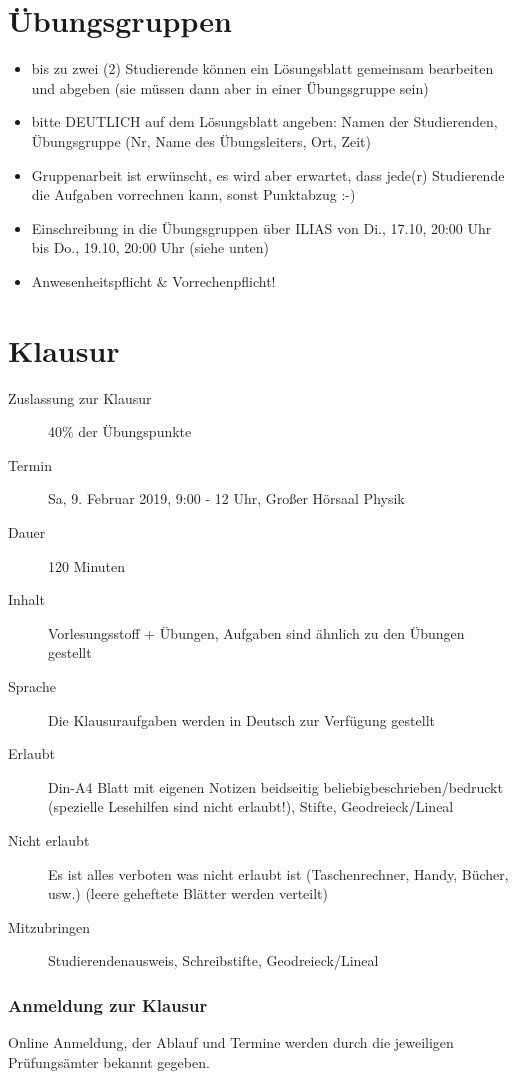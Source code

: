 \documentclass[titlepage,11pt,a4paper,ngerman]{report}
\begin{document}
\section{Übungsgruppen}
\begin{itemize}
	\item bis zu zwei (2) Studierende können ein Lösungsblatt gemeinsam bearbeiten und abgeben (sie müssen dann aber in einer Übungsgruppe sein)
	\item bitte DEUTLICH auf dem Lösungsblatt angeben: Namen der Studierenden, Übungsgruppe (Nr, Name des Übungsleiters, Ort, Zeit)
	\item Gruppenarbeit ist erwünscht, es wird aber erwartet, dass jede(r) Studierende die Aufgaben vorrechnen kann, sonst Punktabzug :-)
	\item Einschreibung in die Übungsgruppen über ILIAS von Di., 17.10, 20:00 Uhr bis Do., 19.10, 20:00 Uhr (siehe unten)
	\item Anwesenheitspflicht \& Vorrechenpflicht!
\end{itemize}

\section{Klausur}
\begin{description}
	\item[Zuslassung zur Klausur] 40\% der Übungspunkte
	\item[Termin] Sa, 9. Februar 2019, 9:00 - 12 Uhr, Großer Hörsaal Physik
	\item[Dauer] 120 Minuten
	\item[Inhalt] Vorlesungsstoff + Übungen, Aufgaben sind ähnlich zu den Übungen gestellt
	\item[Sprache] Die Klausuraufgaben werden in Deutsch zur Verfügung gestellt
	\item[Erlaubt] Din-A4 Blatt mit eigenen Notizen beidseitig beliebigbeschrieben/bedruckt (spezielle Lesehilfen sind nicht erlaubt!), Stifte, Geodreieck/Lineal
	\item[Nicht erlaubt] Es ist alles verboten was nicht erlaubt ist (Taschenrechner, Handy, Bücher, usw.) (leere geheftete Blätter werden verteilt)
	\item[Mitzubringen] Studierendenausweis, Schreibstifte, Geodreieck/Lineal
\end{description}
 
\subsubsection{Anmeldung zur Klausur}
Online Anmeldung, der Ablauf und Termine werden durch die jeweiligen Prüfungsämter bekannt gegeben.
 
\end{document}
